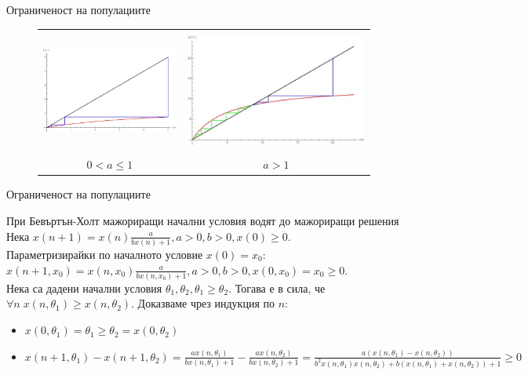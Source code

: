 \begin{frame}[t]{Ограниченост на популациите}


\begin{center}


\begin{figure}
\begin{tabular}{c c}
\includegraphics[width=4.5cm,height=4cm]{climbing1} &
\includegraphics[width=6cm,height=4cm]{climbing2} \\
{$0 < a \leq 1$} & {$a > 1$} \\
\end{tabular}
\end{figure}

\end{center}

\end{frame}


\begin{frame}[t]{Ограниченост на популациите}

\begin{block}{При Бевъртън-Холт мажориращи начални условия водят до мажориращи решения}
Нека $x(n+1)=x(n)\frac{a}{b x(n) + 1}, a > 0, b > 0,x(0) \geq 0$. \\
Параметризирайки по началното условие $x(0) = x_{0}$: \\
$x(n+1,x_{0})= x(n,x_{0})\frac{a}{b x(n,x_{0}) + 1}, a > 0, b > 0,x(0, x_{0}) = x_{0} \geq 0$. \\
Нека са дадени начални условия $\theta_{1}, \theta_{2}, \theta_{1} \geq \theta_{2}$. Тогава е в сила, че $\forall{n} \; x(n,\theta_{1}) \geq x(n,\theta_{2})$. Доказваме чрез индукция по $n$:
\begin{itemize}
\item $x(0, \theta_{1}) = \theta_{1} \geq \theta_{2} = x(0, \theta_{2})$
\item $x(n+1, \theta_{1}) - x(n+1, \theta_{2}) =\frac{a x(n,\theta_{1})}{b x(n,\theta_{1}) + 1} - \frac{a x(n,\theta_{2})}{b x(n,\theta_{2}) + 1} = \frac{a (x(n,\theta_{1}) - x(n,\theta_{2}))}{b^{2} x(n,\theta_{1}) x(n,\theta_{2}) + b(x(n,\theta_{1}) + x(n,\theta_{2})) + 1} \geq 0$
\end{itemize}

\end{block}

\end{frame}



